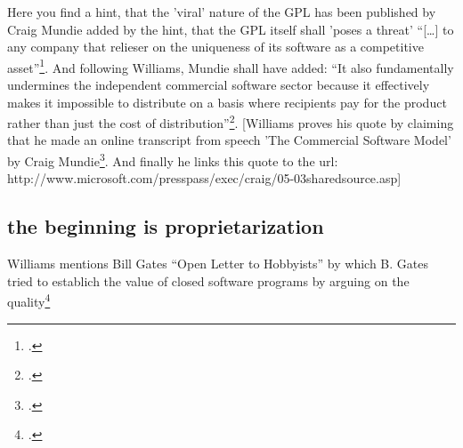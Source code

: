 \documentclass[DIV=calc,BCOR=5mm,11pt,headings=small,oneside,abstract=true, toc=bib]{scrartcl}
\begin{document}
Here you find a hint, that the 'viral' nature of the GPL has been published by
Craig Mundie added by the hint, that the GPL itself shall 'poses a threat'
\enquote{[\ldots] to any company that relieser on the uniqueness of its software
as a competitive asset}\footcite[cf][16]{Williams2002a}. And following
Williams, Mundie shall have added: \enquote{It also fundamentally undermines the
independent commercial software sector because it effectively makes it
impossible to distribute on a basis where recipients pay for the product rather
than just the cost of
distribution}\footcite[cf][16]{Williams2002a}. [Williams proves his
quote by claiming that he made an online transcript from speech 'The Commercial
Software Model' by Craig Mundie\footcite[cf][24]{Williams2002a}. And finally he
links this quote to the url:
http://www.microsoft.com/presspass/exec/craig/05-03sharedsource.asp]

\subsection{the beginning is proprietarization}

Williams mentions Bill Gates \enquote{Open Letter to Hobbyists} by which B.
Gates tried to establich the value of closed software programs by arguing on the
quality\footcite[cf][100]{Williams2002a}
\small

\end{document}
